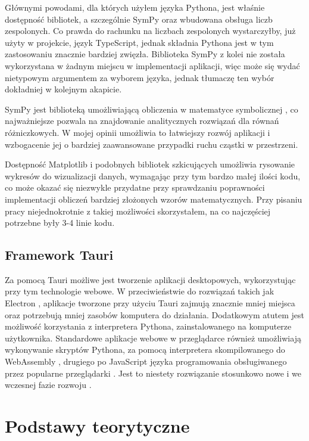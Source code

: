\documentclass{SGGW-thesis}
\begin{document}
	Głównymi powodami, dla których użyłem języka Pythona, jest właśnie dostępność bibliotek, a szczególnie SymPy oraz wbudowana obsługa liczb zespolonych. Co prawda do rachunku na liczbach zespolonych wystarczyłby, już użyty w projekcie, język TypeScript, jednak składnia Pythona jest w tym zastosowaniu znacznie bardziej zwięzła. Biblioteka SymPy z kolei nie została wykorzystana w żadnym miejscu w implementacji aplikacji, więc może się wydać nietypowym argumentem za wyborem języka, jednak tłumaczę ten wybór dokładniej w kolejnym akapicie. 
	
	SymPy jest biblioteką umożliwiającą obliczenia w matematyce symbolicznej \cite{sympy}, co najważniejsze pozwala na znajdowanie analitycznych rozwiązań dla równań różniczkowych. W mojej opinii umożliwia to łatwiejszy rozwój aplikacji i wzbogacenie jej o bardziej zaawansowane przypadki ruchu cząstki w przestrzeni.
	
	Dostępność Matplotlib i podobnych bibliotek szkicujących umożliwia rysowanie wykresów do wizualizacji danych, wymagając przy tym bardzo małej ilości kodu, co może okazać się niezwykle przydatne przy sprawdzaniu poprawności implementacji obliczeń bardziej złożonych wzorów matematycznych. Przy pisaniu pracy niejednokrotnie z takiej możliwości skorzystałem, na co najczęściej potrzebne były 3-4 linie kodu.
	
	\section{Framework Tauri}
	Za pomocą Tauri możliwe jest tworzenie aplikacji desktopowych, wykorzystując przy tym technologie webowe. W przeciwieństwie do rozwiązań takich jak Electron \cite{electron}, aplikacje tworzone przy użyciu Tauri zajmują znacznie mniej miejsca oraz potrzebują mniej zasobów komputera do działania. 
	Dodatkowym atutem jest możliwość korzystania z interpretera Pythona, zainstalowanego na komputerze użytkownika. Standardowe aplikacje webowe w przeglądarce również umożliwiają wykonywanie skryptów Pythona, za pomocą interpretera skompilowanego do WebAssembly \cite{WebAssembly Python}, drugiego po JavaScript języka programowania obsługiwanego przez popularne przeglądarki \cite{browser langs}. Jest to niestety rozwiązanie stosunkowo nowe i we wczesnej fazie rozwoju \cite{python-webassembly}.
	
\chapter{Podstawy teorytyczne}
\end{document}

